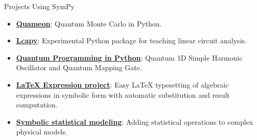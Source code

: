 \documentclass[xcolor=svgnames]{beamer}
\begin{document}
\begin{frame}{Projects Using SymPy}
\begin{itemize}
\item
  \href{http://quameon.sourceforge.net/}{\textbf{Quameon}}: Quantum
  Monte Carlo in Python.
\item
  \href{http://lcapy.elec.canterbury.ac.nz/}{\textbf{Lcapy}}:
  Experimental Python package for teaching linear circuit analysis.
\item
  \href{http://digitalcommons.calpoly.edu/cgi/viewcontent.cgi?article=1072\&context=physsp/}{\textbf{Quantum
  Programming in Python}}: Quantum 1D Simple Harmonic Oscillator and
  Quantum Mapping Gate.
\item
  \href{http://mech.fsv.cvut.cz/~stransky/software/latexexpr/doc/}{\textbf{LaTeX
  Expression project}}: Easy \LaTeX{} typesetting of algebraic expressions
  in symbolic form with automatic substitution and result computation.
\item
  \href{https://www.researchgate.net/publication/260585491_Symbolic_Statistics_with_SymPy/}{\textbf{Symbolic
  statistical modeling}}: Adding statistical operations to complex
  physical models.
\end{itemize}
\end{frame}
\end{document}
